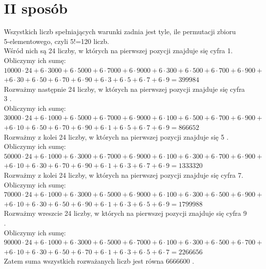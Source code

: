 \documentclass[10pt]{article}
\begin{document}
\section*{II sposób}
Wszystkich liczb spełniających warunki zadnia jest tyle, ile permutacji zbioru\\
5-elementowego, czyli 5!=120 liczb.\\
Wśród nich są 24 liczby, w których na pierwszej pozycji znajduje się cyfra 1.\\
Obliczymy ich sumę:\\
$10000 \cdot 24+6 \cdot 3000+6 \cdot 5000+6 \cdot 7000+6 \cdot 9000+6 \cdot 300+6 \cdot 500+6 \cdot 700+6 \cdot 900+$\\
$+6 \cdot 30+6 \cdot 50+6 \cdot 70+6 \cdot 90+6 \cdot 3+6 \cdot 5+6 \cdot 7+6 \cdot 9=399984$\\
Rozważmy następnie 24 liczby, w których na pierwszej pozycji znajduje się cyfra 3 .\\
Obliczymy ich sumę:\\
$30000 \cdot 24+6 \cdot 1000+6 \cdot 5000+6 \cdot 7000+6 \cdot 9000+6 \cdot 100+6 \cdot 500+6 \cdot 700+6 \cdot 900+$ $+6 \cdot 10+6 \cdot 50+6 \cdot 70+6 \cdot 90+6 \cdot 1+6 \cdot 5+6 \cdot 7+6 \cdot 9=866652$\\
Rozważmy z kolei 24 liczby, w których na pierwszej pozycji znajduje się 5 . Obliczymy ich sumę:\\
$50000 \cdot 24+6 \cdot 1000+6 \cdot 3000+6 \cdot 7000+6 \cdot 9000+6 \cdot 100+6 \cdot 300+6 \cdot 700+6 \cdot 900+$\\
$+6 \cdot 10+6 \cdot 30+6 \cdot 70+6 \cdot 90+6 \cdot 1+6 \cdot 3+6 \cdot 7+6 \cdot 9=1333320$\\
Rozważmy z kolei 24 liczby, w których na pierwszej pozycji znajduje się cyfra 7. Obliczymy ich sumę:\\
$70000 \cdot 24+6 \cdot 1000+6 \cdot 3000+6 \cdot 5000+6 \cdot 9000+6 \cdot 100+6 \cdot 300+6 \cdot 500+6 \cdot 900+$\\
$+6 \cdot 10+6 \cdot 30+6 \cdot 50+6 \cdot 90+6 \cdot 1+6 \cdot 3+6 \cdot 5+6 \cdot 9=1799988$\\
Rozważmy wreszcie 24 liczby, w których na pierwszej pozycji znajduje się cyfra 9 .\\
Obliczymy ich sumę:\\
$90000 \cdot 24+6 \cdot 1000+6 \cdot 3000+6 \cdot 5000+6 \cdot 7000+6 \cdot 100+6 \cdot 300+6 \cdot 500+6 \cdot 700+$ $+6 \cdot 10+6 \cdot 30+6 \cdot 50+6 \cdot 70+6 \cdot 1+6 \cdot 3+6 \cdot 5+6 \cdot 7=2266656$\\
Zatem suma wszystkich rozważanych liczb jest równa 6666600 .
\end{document}

